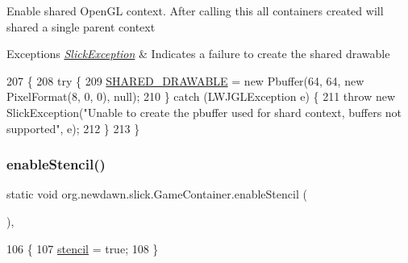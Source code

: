 Enable shared Open\+GL context. After calling this all containers created will shared a single parent context


\begin{DoxyExceptions}{Exceptions}
{\em \mbox{\hyperlink{classorg_1_1newdawn_1_1slick_1_1_slick_exception}{Slick\+Exception}}} & Indicates a failure to create the shared drawable \\
\hline
\end{DoxyExceptions}

\begin{DoxyCode}
207                                                                    \{
208         \textcolor{keywordflow}{try} \{
209             \mbox{\hyperlink{classorg_1_1newdawn_1_1slick_1_1_game_container_ac1844f34fb7c738852219330998424a3}{SHARED\_DRAWABLE}} = \textcolor{keyword}{new} Pbuffer(64, 64, \textcolor{keyword}{new} PixelFormat(8, 0, 0), null);
210         \} \textcolor{keywordflow}{catch} (LWJGLException e) \{
211             \textcolor{keywordflow}{throw} \textcolor{keyword}{new} SlickException(\textcolor{stringliteral}{"Unable to create the pbuffer used for shard context, buffers not
       supported"}, e);
212         \}
213     \}
\end{DoxyCode}
\mbox{\label{classorg_1_1newdawn_1_1slick_1_1_game_container_a5abd71c1092ddc195db5fd775fe7caa7}} 
\subsubsection{\texorpdfstring{enable\+Stencil()}{enableStencil()}}
{\footnotesize\ttfamily static void org.\+newdawn.\+slick.\+Game\+Container.\+enable\+Stencil (\begin{DoxyParamCaption}{ }\end{DoxyParamCaption})\hspace{0.3cm}{\ttfamily [inline]}, {\ttfamily [static]}}


\begin{DoxyCode}
106                                        \{
107         \mbox{\hyperlink{classorg_1_1newdawn_1_1slick_1_1_game_container_ad148e9e758ad655dbdc0b9e5fb8b54a0}{stencil}} = \textcolor{keyword}{true};
108     \}
\end{DoxyCode}
\mbox{\label{classorg_1_1newdawn_1_1slick_1_1_game_container_a1e8c835b781b018347f50dcf37bbb5c2}} 
